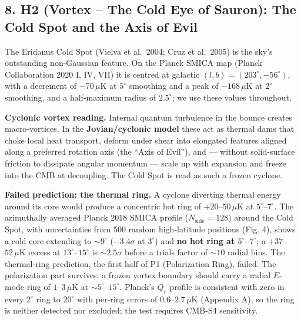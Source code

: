 \documentclass[
  11pt,
]{article}
\begin{document}
\hypertarget{h2-vortex-the-cold-eye-of-sauron-the-cold-spot-and-the-axis-of-evil}{%
\subsection{\texorpdfstring{\textbf{8. H2 (Vortex -- The Cold Eye of
Sauron): The Cold Spot and the Axis of
Evil}}{8. H2 (Vortex -- The Cold Eye of Sauron): The Cold Spot and the Axis of Evil}}\label{h2-vortex-the-cold-eye-of-sauron-the-cold-spot-and-the-axis-of-evil}}

The Eridanus Cold Spot (Vielva et al.~2004; Cruz et al.~2005) is the
sky's outstanding non-Gaussian feature. On the Planck SMICA map (Planck
Collaboration 2020 I, IV, VII) it is centred at galactic
\((l, b) = (203^\circ, -56^\circ)\), with a decrement of \(-70\,\mu\)K
at \(5^\circ\) smoothing and a peak of \(-168\,\mu\)K at \(2^\circ\)
smoothing, and a half-maximum radius of \(2.5^\circ\); we use these
values throughout.

\textbf{Cyclonic vortex reading.} Internal quantum turbulence in the
bounce creates macro-vortices. In the \textbf{Jovian/cyclonic model}
these act as thermal dams that choke local heat transport, deform under
shear into elongated features aligned along a preferred rotation axis
(the ``Axis of Evil''), and --- without solid-surface friction to
dissipate angular momentum --- scale up with expansion and freeze into
the CMB at decoupling. The Cold Spot is read as such a frozen cyclone.

\textbf{Failed prediction: the thermal ring.} A cyclone diverting
thermal energy around its core would produce a concentric hot ring of
\(+20\)--\(50\,\mu\)K at \(5^\circ\)--\(7^\circ\). The azimuthally
averaged Planck 2018 SMICA profile (\(N_{\text{side}} = 128\)) around
the Cold Spot, with uncertainties from 500 random high-latitude
positions (Fig. 4), shows a cold core extending to \(\sim\!9^\circ\)
(\(-3.4\sigma\) at \(3^\circ\)) and \textbf{no hot ring at
\(5^\circ\)--\(7^\circ\)}; a \(+37\)--\(52\,\mu\)K excess at
\(13^\circ\)--\(15^\circ\) is \(\sim\!2.5\sigma\) before a trials factor
of \(\sim\!10\) radial bins. The thermal-ring prediction, the first half
of P1 (Polarization Ring), failed. The polarization part survives: a
frozen vortex boundary should carry a radial \(E\)-mode ring of
\(1\)--\(3\,\mu\)K at \(\sim\!5^\circ\)--\(15^\circ\). Planck's \(Q_r\)
profile is consistent with zero in every \(2^\circ\) ring to
\(20^\circ\) with per-ring errors of \(0.6\)--\(2.7\,\mu\)K (Appendix
A), so the ring is neither detected nor excluded; the test requires
CMB-S4 sensitivity.
\end{document}
